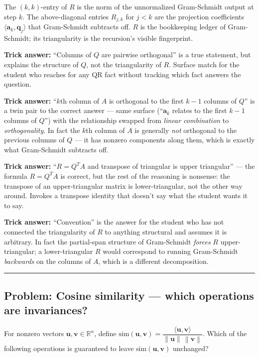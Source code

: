 \documentclass[12pt]{amsart}
\newcommand{\divider}{
  \vspace{-1em}
  \noindent
  \raisebox{-0.15ex}{\textbullet}%
  \hspace{0.5em}%
  \rule[0.5ex]{0.95\textwidth}{1.0pt}%
  \hspace{0.5em}%
  \raisebox{-0.15ex}{\textbullet}%
  \vspace{0em}
}
\newcommand{\norm}[1]{\left\|#1\right\|}
\begin{document}
The $(k,k)$-entry of $R$ is the norm of the unnormalized Gram-Schmidt output
at step $k$. The above-diagonal entries $R_{j,k}$ for $j < k$ are the
projection coefficients $\langle \mathbf{a}_k, \mathbf{q}_j \rangle$ that
Gram-Schmidt subtracts off. $R$ is the bookkeeping ledger of Gram-Schmidt;
its triangularity is the recursion's visible fingerprint.

\textbf{Trick answer:}
``Columns of $Q$ are pairwise orthogonal'' is a true statement, but explains
the structure of $Q$, not the triangularity of $R$. Surface match for the
student who reaches for any QR fact without tracking which fact answers
the question.

\textbf{Trick answer:}
``$k$th column of $A$ is orthogonal to the first $k-1$ columns of $Q$'' is
a twin pair to the correct answer --- same surface (``$\mathbf{a}_k$ relates
to the first $k-1$ columns of $Q$'') with the relationship swapped from
\emph{linear combination} to \emph{orthogonality}. In fact the $k$th column
of $A$ is generally \emph{not} orthogonal to the previous columns of $Q$
--- it has nonzero components along them, which is exactly what
Gram-Schmidt subtracts off.

\textbf{Trick answer:}
``$R = Q^T A$ and transpose of triangular is upper triangular'' --- the
formula $R = Q^T A$ is correct, but the rest of the reasoning is nonsense:
the transpose of an upper-triangular matrix is lower-triangular, not the
other way around. Invokes a transpose identity that doesn't say what the
student wants it to say.

\textbf{Trick answer:}
``Convention'' is the answer for the student who has not connected the
triangularity of $R$ to anything structural and assumes it is arbitrary.
In fact the partial-span structure of Gram-Schmidt \emph{forces} $R$
upper-triangular; a lower-triangular $R$ would correspond to running
Gram-Schmidt \emph{backwards} on the columns of $A$, which is a different
decomposition.

\divider

\subsection*{Problem: Cosine similarity --- which operations are invariances?}

For nonzero vectors $\mathbf{u}, \mathbf{v} \in \mathbb{R}^n$, define
$\mathrm{sim}(\mathbf{u}, \mathbf{v}) = \dfrac{\langle \mathbf{u}, \mathbf{v} \rangle}{\norm{\mathbf{u}}\,\norm{\mathbf{v}}}$.
Which of the following operations is guaranteed to leave
$\mathrm{sim}(\mathbf{u}, \mathbf{v})$ unchanged?
\end{document}

